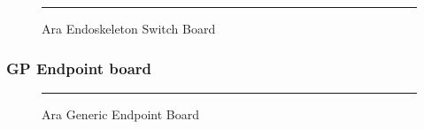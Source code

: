 \begin{figure}[htbp]
  \centering
    \rule{35em}{0.5pt}
  \caption[Ara Endoskeleton Switch Board]{Ara Endoskeleton Switch Board}
  \label{fig:endo}
\end{figure}

\subsubsection{GP Endpoint board}

\begin{figure}[htbp]
  \centering
    \rule{35em}{0.5pt}
  \caption[Ara Generic Endpoint Board]{Ara Generic Endpoint Board}
  \label{fig:gpendpoint}
\end{figure}

